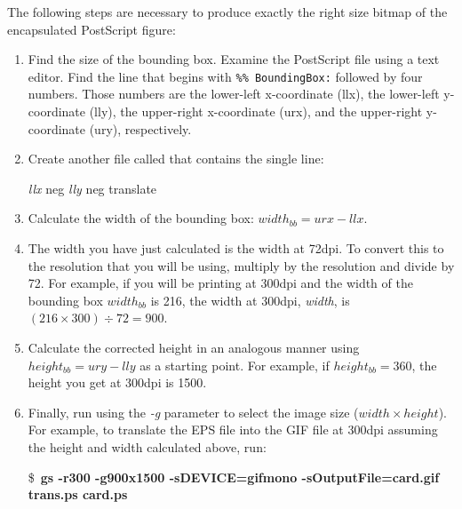   The following steps are necessary to produce exactly the right size
  bitmap of the encapsulated PostScript figure:
  
  \begin{enumerate}
    \item Find the size of the bounding box.  Examine the PostScript file
          using a text editor.  Find the line that begins with
          \verb|%% BoundingBox:|
        followed by four numbers.
        Those numbers are the lower-left x-coordinate (llx), the 
        lower-left y-coordinate (lly), the upper-right x-coordinate (urx),
        and the upper-right y-coordinate (ury), respectively.
  
    \item Create another file called  that contains
          the single line:
        
\begin{ttindent}
\textit{llx} neg \textit{lly} neg translate
\end{ttindent}
        
    \item Calculate the width of the bounding box: $width_{bb} = urx - llx$.
  
    \item The width you have just calculated is the width at 72dpi.  To 
          convert this to the resolution that you will be using, multiply
          by the resolution and divide by 72.  For example, if you will
          be printing at 300dpi and the width of the bounding box 
          $width_{bb}$ is 216, the width at 300dpi, \textit{width}, 
          is $(216 \times 300) \div 72 = 900$.
  
    \item Calculate the corrected height in an analogous manner using
          $height_{bb} = ury - lly$ as a starting point.  For example,
          if $height_{bb} = 360$, the height you get at 300dpi is 1500.
\newpage
    \item Finally, run  using the \textit{-g} parameter to
          select the image size ($width \times height$).  
          For example, to translate the EPS file  into
          the GIF file   at 300dpi assuming the
          height and width calculated above, run:
  
  \begin{ttindent}
\$\ \textbf{gs -r300 -g900x1500 -sDEVICE=gifmono {\bs}
       -sOutputFile=card.gif trans.ps card.ps}
  \end{ttindent}
  
    \end{enumerate}

